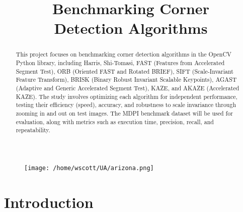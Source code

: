 \documentclass[journal]{IEEEtran}
\begin{document}
\title{Benchmarking Corner\\Detection Algorithms}

\author{
}

\maketitle

\thispagestyle{plain}  %
\pagestyle{plain} 

\begin{figure}[h]
    \centering
    \begin{minipage}{\textwidth}
        \centering
    \texttt{[image: /home/wscott/UA/arizona.png]}
    \end{minipage}
\end{figure}

\onecolumn
\twocolumn
\pagebreak

\begin{abstract}
This project focuses on benchmarking corner detection algorithms in the OpenCV Python library, including Harris, Shi-Tomasi, FAST (Features from Accelerated Segment Test), ORB (Oriented FAST and Rotated BRIEF), SIFT (Scale-Invariant Feature Transform), BRISK (Binary Robust Invariant Scalable Keypoints), AGAST (Adaptive and Generic Accelerated Segment Test), KAZE, and AKAZE (Accelerated KAZE). The study involves optimizing each algorithm for independent performance, testing their efficiency (speed), accuracy, and robustness to scale invariance through zooming in and out on test images. The MDPI benchmark dataset will be used for evaluation, along with metrics such as execution time, precision, recall, and repeatability.
\end{abstract}

\section{Introduction}
\end{document}
